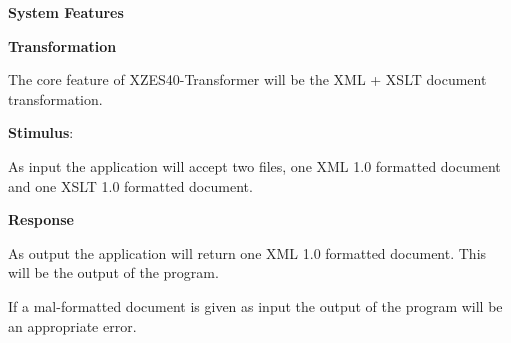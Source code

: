 


\textbf{System Features}


\textbf{Transformation}

The core feature of XZES40-Transformer will be the XML + XSLT document transformation.

\begin{description}
  \item{
    \textbf{Stimulus}:

    As input the application will accept two files, one XML 1.0 formatted document and one XSLT 1.0 formatted document.
  }
  \item{
  \textbf{Response}

  As output the application will return one XML 1.0 formatted document.
  This will be the output of the program.

  If a mal-formatted document is given as input the output of the program will be an appropriate error.
  }
\end{description}

